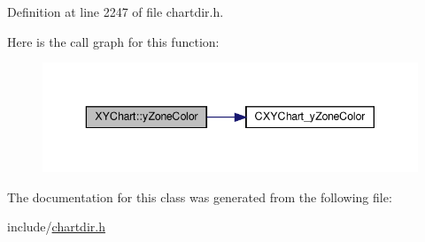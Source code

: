 Definition at line 2247 of file chartdir.\+h.

Here is the call graph for this function\+:
\nopagebreak
\begin{figure}[H]
\begin{center}
\leavevmode
\includegraphics[width=343pt]{class_x_y_chart_a5501b16635ca95921bf9aa74621a3793_cgraph}
\end{center}
\end{figure}


The documentation for this class was generated from the following file\+:\begin{DoxyCompactItemize}
\item 
include/\hyperlink{chartdir_8h}{chartdir.\+h}\end{DoxyCompactItemize}
